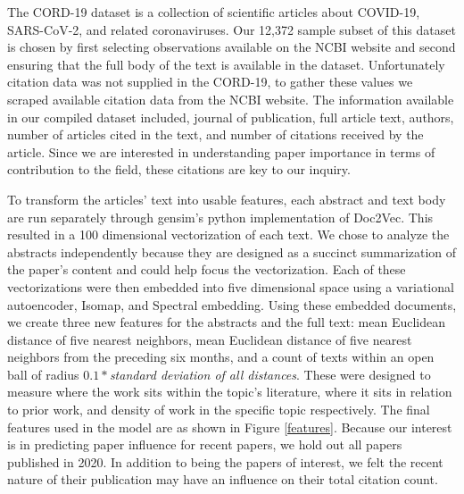 \documentclass{article} %
\begin{document}
The CORD-19 dataset is a collection of scientific articles about COVID-19, SARS-CoV-2, and related coronaviruses. Our 12,372 sample subset of this dataset is chosen by first selecting observations available on the NCBI website and second ensuring that the full body of the text is available in the dataset. Unfortunately citation data was not supplied in the CORD-19, to gather these values we scraped available citation data from the NCBI website. The information available in our compiled dataset included, journal of publication, full article text, authors, number of articles cited in the text, and number of citations received by the article. Since we are interested in understanding paper importance in terms of contribution to the field, these citations are key to our inquiry.

To transform the articles' text into usable features, each abstract and text body are run separately through gensim's python implementation of Doc2Vec. This resulted in a 100 dimensional vectorization of each text. We chose to analyze the abstracts independently because they are designed as a succinct summarization of the paper's content and could help focus the vectorization. Each of these vectorizations were then embedded into five dimensional space using a variational autoencoder, Isomap, and Spectral embedding. Using these embedded documents, we create three new features for the abstracts and the full text: mean Euclidean distance of five nearest neighbors, mean Euclidean distance of five nearest neighbors from the preceding six months, and a count of texts within an open ball of radius $0.1 * $\textit{standard deviation of all distances}. These were designed to measure where the work sits within the topic's literature, where it sits in relation to prior work, and density of work in the specific topic respectively. The final features used in the model are as shown in Figure \ref{features}. Because our interest is in predicting paper influence for recent papers, we hold out all papers published in 2020. In addition to being the papers of interest, we felt the recent nature of their publication may have an influence on their total citation count.
\end{document}
